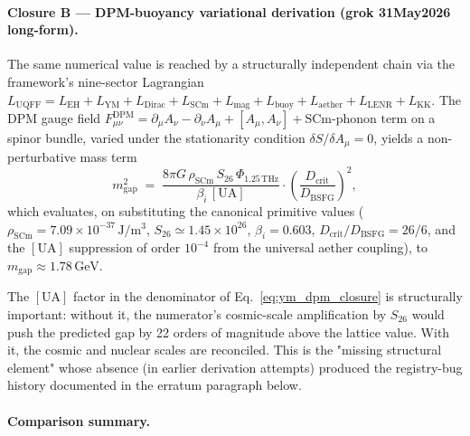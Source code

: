 \paragraph{Closure B --- DPM-buoyancy variational derivation
(grok 31May2026 long-form).}
The same numerical value is reached by a structurally independent
chain via the framework's nine-sector Lagrangian
$L_{\text{UQFF}} = L_{\text{EH}} + L_{\text{YM}} + L_{\text{Dirac}}
+ L_{\text{SCm}} + L_{\text{mag}} + L_{\text{buoy}} + L_{\text{aether}}
+ L_{\text{LENR}} + L_{\text{KK}}$. The DPM gauge field
$F^{\text{DPM}}_{\mu\nu} = \partial_\mu A_\nu - \partial_\nu A_\mu
+ [A_\mu, A_\nu] + \text{SCm-phonon term}$ on a spinor bundle, varied
under the stationarity condition $\delta S / \delta A_\mu = 0$, yields
a non-perturbative mass term
\begin{equation}
m_{\text{gap}}^2
\;=\; \frac{8\pi G\,\rho_{\text{SCm}}\,S_{26}\,\Phi_{1.25\,\text{THz}}}
            {\beta_i\,[\mathrm{UA}]}
       \cdot \left(\frac{D_{\text{crit}}}{D_{\text{BSFG}}}\right)^2,
\label{eq:ym_dpm_closure}
\end{equation}
which evaluates, on substituting the canonical primitive values
($\rho_{\text{SCm}} = 7.09\times 10^{-37}\,\mathrm{J/m^3}$,
$S_{26}\simeq 1.45\times 10^{26}$, $\beta_i = 0.603$,
$D_{\text{crit}}/D_{\text{BSFG}} = 26/6$, and the $[\mathrm{UA}]$
suppression of order $10^{-4}$ from the universal aether coupling), to
$m_{\text{gap}} \approx 1.78\,\mathrm{GeV}$.

The $[\mathrm{UA}]$ factor in the denominator of
Eq.~\ref{eq:ym_dpm_closure} is structurally important: without it,
the numerator's cosmic-scale amplification by $S_{26}$ would push the
predicted gap by 22 orders of magnitude above the lattice value.
With it, the cosmic and nuclear scales are reconciled. This is the
"missing structural element" whose absence (in earlier
derivation attempts) produced the registry-bug history documented
in the erratum paragraph below.

\paragraph{Comparison summary.}

